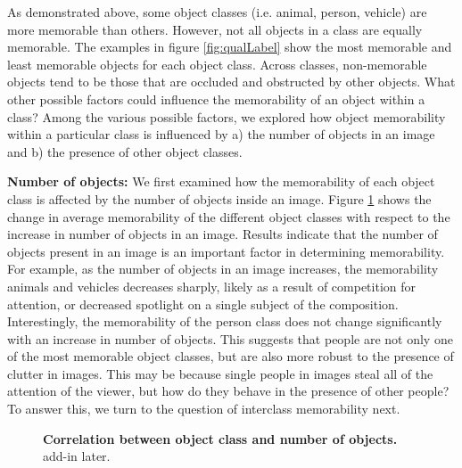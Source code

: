 As demonstrated above, some object classes (i.e. animal, person, vehicle) are more memorable than others. However, not all objects in a class are equally memorable. The examples in figure \ref{fig:qualLabel} show the most memorable and least memorable objects for each object class. Across classes,  non-memorable objects tend to be those that are occluded and obstructed by other objects. What other possible factors could influence the memorability of an object within a class? Among the various possible factors, we explored how object memorability within a particular class is influenced by a) the number of objects in an image and b) the presence of other object classes.

\textbf{Number of objects:} We first examined how the memorability of each object class is affected by the number of objects inside an image. Figure \ref{fig:obLabelChange} shows the change in average memorability of the different object classes with respect to the increase in number of objects in an image. Results indicate that the number of objects present in an image is an important factor in determining memorability. For example, as the number of objects in an image increases, the memorability  animals and vehicles decreases sharply, likely as a result of competition for attention, or decreased spotlight on a single subject of the composition.  Interestingly, the memorability of the person class does not change significantly with an increase in number of objects. This suggests that people are not only one of the most memorable object classes, but are also more robust to the presence of clutter in images. This may be because single people in images steal all of the attention of the viewer, but how do they behave in the presence of other people? To answer this, we turn to the question of interclass memorability next.

\begin{figure}[t]
\centering
{}
\vspace{-5mm}\caption{\footnotesize\textbf{Correlation between object class and number of objects.} add-in later. }\label{fig:obLabelChange}
\end{figure}

